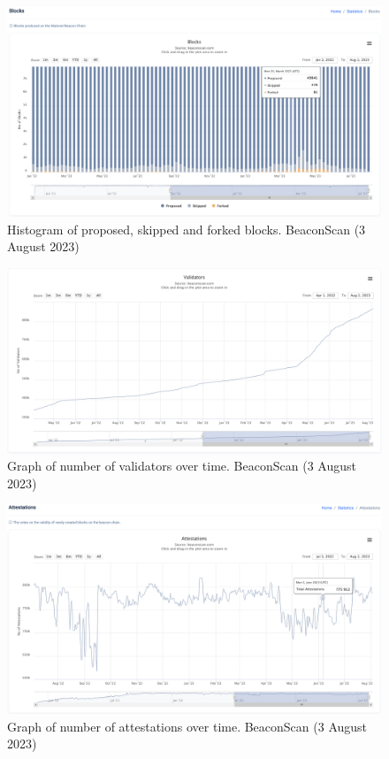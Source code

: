 \documentclass[UTF8]{article}
\begin{document}
\begin{figure}[htbp]
\begin{center}
\includegraphics[width=\linewidth]{images/beaconscan8}
\caption{Histogram of proposed, skipped and forked blocks. BeaconScan (3 August 2023)}
\label{fig:beaconscan8}
\end{center}
\end{figure}

\begin{figure}[htbp]
\begin{center}
\includegraphics[width=\linewidth]{images/beaconscan9}
\caption{Graph of number of validators over time. BeaconScan (3 August 2023)}
\label{fig:beaconscan9}
\end{center}
\end{figure}

\begin{figure}[htbp]
\begin{center}
\includegraphics[width=\linewidth]{images/beaconscan10}
\caption{Graph of number of attestations over time. BeaconScan (3 August 2023)}
\label{fig:beaconscan10}
\end{center}
\end{figure}
\end{document}

